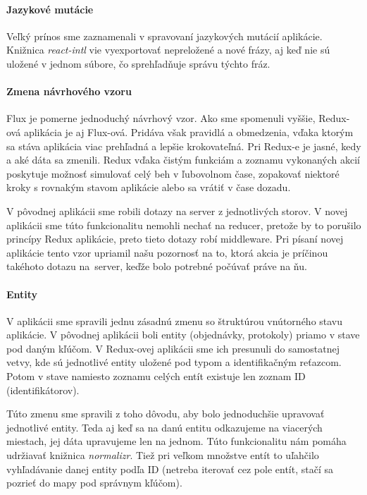 \paragraph{Jazykové mutácie}
Veľký prínos sme zaznamenali v spravovaní jazykových mutácií aplikácie. Knižnica \emph{react-intl} vie vyexportovať nepreložené a nové frázy, aj keď nie sú uložené v jednom súbore, čo sprehľadňuje správu týchto fráz.

\paragraph{Zmena návrhového vzoru}
Flux je pomerne jednoduchý návrhový vzor. Ako sme spomenuli vyššie, Redux-ová aplikácia je aj Flux-ová. Pridáva však pravidlá a obmedzenia, vďaka ktorým sa stáva aplikácia viac prehľadná a lepšie krokovateľná. Pri Redux-e je jasné, kedy a aké dáta sa zmenili. Redux vďaka čistým funkciám a zoznamu vykonaných akcií poskytuje možnosť simulovať celý beh v ľubovolnom čase, zopakovať niektoré kroky s rovnakým stavom aplikácie alebo sa vrátiť v čase dozadu.

V pôvodnej aplikácii sme robili dotazy na server z jednotlivých storov. V novej aplikácii sme túto funkcionalitu nemohli nechať na reducer, pretože by to porušilo princípy Redux aplikácie, preto tieto dotazy robí middleware. Pri písaní novej aplikácie tento vzor upriamil našu pozornosť na to, ktorá akcia je príčinou takéhoto dotazu na~server, keďže bolo potrebné počúvať práve na ňu.%

\paragraph{Entity}
V aplikácii sme spravili jednu zásadnú zmenu so štruktúrou vnútorného stavu aplikácie. V pôvodnej aplikácii boli entity (objednávky, protokoly) priamo v stave pod daným kľúčom. 
V Redux-ovej aplikácii sme ich presunuli do samostatnej vetvy, kde sú jednotlivé entity uložené pod typom a identifikačným reťazcom. Potom v stave namiesto zoznamu celých entít existuje len zoznam ID (identifikátorov). 

Túto zmenu sme spravili z toho dôvodu, aby bolo jednoduchšie upravovať jednotlivé entity. Teda aj keď sa na danú entitu odkazujeme na viacerých miestach, jej dáta upravujeme len na jednom. Túto funkcionalitu nám pomáha udržiavať knižnica \emph{normalizr}.
Tiež pri veľkom množstve entít to uľahčilo vyhľadávanie danej entity podľa ID (netreba iterovať cez pole entít, stačí sa pozrieť do mapy pod správnym kľúčom).

